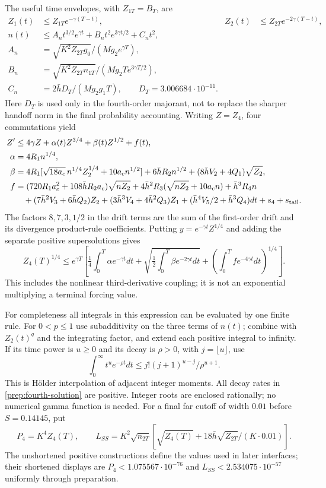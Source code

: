 \documentclass[11pt]{article}
\theoremstyle{definition}\newtheorem{definition}[theorem]{Definition}
\theoremstyle{remark}\newtheorem{remark}[theorem]{Remark}
\begin{document}
The useful time envelopes, with $Z_{1T}=B_T$, are
\begin{align*}
 Z_1(t)&\le Z_{1T}e^{-\gamma(T-t)},&
 Z_2(t)&\le Z_{2T}e^{-2\gamma(T-t)},\\
 n(t)&\le A_nt^{3/2}e^{\gamma t}+B_nt^2e^{3\gamma t/2}+C_nt^2,\\
 A_n&=\sqrt{K^2Z_{2T}g_0}/(Mg_2e^{\gamma T}),\\
 B_n&=\sqrt{K^2Z_{2T}n_{1T}}/(Mg_2Te^{3\gamma T/2}),\\
 C_n&=2\bar h D_T/(Mg_2g_1T),\qquad D_T=3.006684\cdot10^{-11}.
\end{align*}
Here $D_T$ is used only in the fourth-order majorant, not to replace the
sharper handoff norm in the final probability accounting.
Writing $Z=Z_4$, four commutations yield
\begin{align}
 Z'&\le4\gamma Z+\alpha(t)Z^{3/4}+\beta(t)Z^{1/2}+f(t),\\
 \alpha&=4R_1n^{1/4},\\
 \beta&=4R_1[\sqrt{18a_c}\,n^{1/4}Z_2^{1/4}+10a_cn^{1/2}]
       +6\bar hR_2n^{1/2}+(8\bar hV_2+4Q_1)\sqrt{Z_2},\\
 f&=(720R_1a_c^2+108\bar hR_2a_c)\sqrt{nZ_2}
       +4\bar h^2R_3(\sqrt{nZ_2}+10a_cn)+\bar h^3R_4n\\
 &\quad+(7\bar h^2V_3+6\bar hQ_2)Z_2
       +(3\bar h^3V_4+4\bar h^2Q_3)Z_1
       +(\bar h^4V_5/2+\bar h^3Q_4)dt+s_4+s_{\rm tail}.
 \label{prep:fourth-system}
\end{align}
The factors $8,7,3,1/2$ in the drift terms are the sum of the
first-order drift and its divergence product-rule coefficients.
Putting $y=e^{-\gamma t}Z^{1/4}$ and adding the separate positive
supersolutions gives
\begin{equation}
 Z_4(T)^{1/4}\le e^{\gamma T}
 \left[\tfrac14\int_0^T\alpha e^{-\gamma t}dt
 +\sqrt{\tfrac12\int_0^T\beta e^{-2\gamma t}dt}
 +\left(\int_0^Tf e^{-4\gamma t}dt\right)^{1/4}\right].
 \label{prep:fourth-solution}
\end{equation}
This includes the nonlinear third-derivative coupling; it is not an
exponential multiplying a terminal forcing value.

For completeness all integrals in this expression can be evaluated by
one finite rule. For $0<p\le1$ use subadditivity on the three terms of
$n(t)$; combine with $Z_2(t)^q$ and the integrating factor, and extend
each positive integral to infinity. If its time power is $u\ge0$ and
its decay is $\rho>0$, with $j=\lfloor u\rfloor$, use
\[
 \int_0^\infty t^ue^{-\rho t}dt
 \le j!(j+1)^{u-j}/\rho^{u+1}.
\]
This is H\"older interpolation of adjacent integer moments. All decay
rates in \eqref{prep:fourth-solution} are positive. Integer roots are
enclosed rationally; no numerical gamma function is needed.
For a final far cutoff of width $0.01$ before $S=0.14145$, put
\begin{equation}
 P_4=K^4Z_4(T),\qquad
 L_{SS}=K^2\sqrt{n_{2T}}
 [\sqrt{Z_4(T)}+18\bar h\sqrt{Z_{2T}}/(K\cdot0.01)].
 \label{prep:far-hessian}
\end{equation}
The unshortened positive constructions define the values used in later
interfaces; their shortened displays are $P_4<1.075567\cdot10^{-76}$ and
$L_{SS}<2.534075\cdot10^{-57}$ uniformly through preparation.
\end{document}
